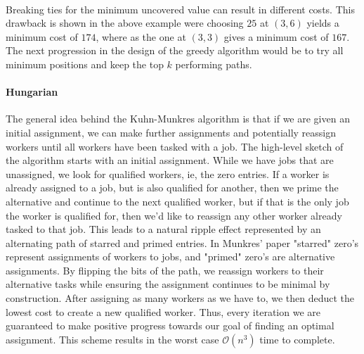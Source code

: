 \documentclass{article}
\newcommand{\boundedBy}[1]{\mathcal{O} \left ( #1 \right )}
\begin{document}
\paragraph{} Breaking ties for the minimum uncovered value can result in different costs. This drawback is shown in the above example were choosing $25$ at $(3,6)$ yields a minimum cost of $174$, where as the one at $(3, 3)$ gives a minimum cost of $167$. The next progression in the design of the greedy algorithm would be to try all minimum positions and keep the top $k$ performing paths.

\paragraph{Hungarian} The general idea behind the Kuhn-Munkres algorithm is that if we are given an initial assignment, we can make further assignments and potentially reassign workers until all workers have been tasked with a job. The high-level sketch of the algorithm starts with an initial assignment. While we have jobs that are unassigned, we look for qualified workers, ie, the zero entries. If a worker is already assigned to a job, but is also qualified for another, then we prime the alternative and continue to the next qualified worker, but if that is the only job the worker is qualified for, then we'd like to reassign any other worker already tasked to that job. This leads to a natural ripple effect represented by an alternating path of starred and primed entries. In Munkres' paper \cite{munkres1957algorithms} "starred" zero's represent assignments of workers to jobs, and "primed" zero's are alternative assignments. By flipping the bits of the path, we reassign workers to their alternative tasks while ensuring the assignment continues to be minimal by construction. After assigning as many workers as we have to, we then deduct the lowest cost to create a new qualified worker. Thus, every iteration we are guaranteed to make positive progress towards our goal of finding an optimal assignment. This scheme results in the worst case $\boundedBy{n^3}$ time to complete.
\end{document}
